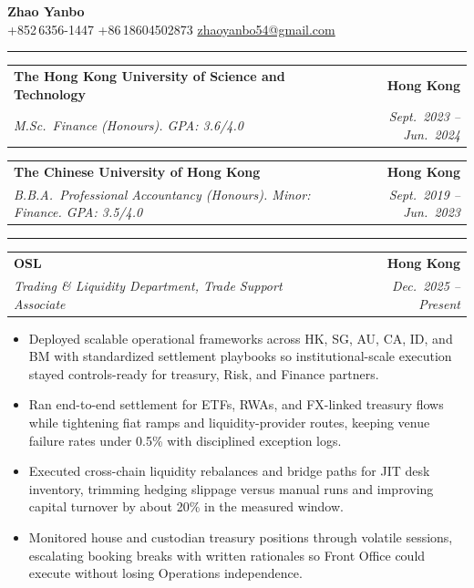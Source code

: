 \documentclass[9pt,a4paper]{extarticle}
\makeatletter
\newcommand{\ressection}[1]{%
  \vspace{0.8em}%
  \noindent{\large\scshape\bfseries #1}\par\nobreak
  \vspace{-\parskip}%
  \vspace{-\parskip}%
  \vspace{-\parskip}%
  \vspace{-\parskip}%
  \noindent\rule{\linewidth}{0.1pt}\par\nobreak
  \vspace{-\parskip}%
}
\newcommand{\resumeSubheading}[4]{%
  \vspace{0.6em}%
  \begin{tabular*}{\textwidth}{l@{\extracolsep{\fill}}r}
    \textbf{#1} & \textbf{#2} \\
    \textit{\small #3} & \textit{\small #4} \\
  \end{tabular*}\vspace{0.32em}}
\makeatother
\begin{document}
\begin{center}
  {\LARGE\bfseries Zhao Yanbo}\\[0.35em]
  \small
  +852\,6356-1447 \;\textbar\;
  +86\,18604502873 \;\textbar\;
  \href{mailto:zhaoyanbo54@gmail.com}{zhaoyanbo54@gmail.com}
\end{center}
\vspace{-0.2em}

\ressection{Education}

\resumeSubheading{The Hong Kong University of Science and Technology}{Hong Kong}{M.Sc.\ Finance (Honours). GPA: 3.6/4.0}{Sept.\ 2023 -- Jun.\ 2024}

\resumeSubheading{The Chinese University of Hong Kong}{Hong Kong}{B.B.A.\ Professional Accountancy (Honours). Minor: Finance. GPA: 3.5/4.0}{Sept.\ 2019 -- Jun.\ 2023}

\ressection{Work Experience}

\resumeSubheading{OSL}{Hong Kong}{Trading \& Liquidity Department, Trade Support Associate}{Dec.\ 2025 -- Present}
\begin{itemize}
  \item Deployed scalable operational frameworks across HK, SG, AU, CA, ID, and BM with standardized settlement playbooks so institutional-scale execution stayed controls-ready for treasury, Risk, and Finance partners.
  \item Ran end-to-end settlement for ETFs, RWAs, and FX-linked treasury flows while tightening fiat ramps and liquidity-provider routes, keeping venue failure rates under 0.5\% with disciplined exception logs.
  \item Executed cross-chain liquidity rebalances and bridge paths for JIT desk inventory, trimming hedging slippage versus manual runs and improving capital turnover by about 20\% in the measured window.
  \item Monitored house and custodian treasury positions through volatile sessions, escalating booking breaks with written rationales so Front Office could execute without losing Operations independence.
\end{itemize}
\end{document}
